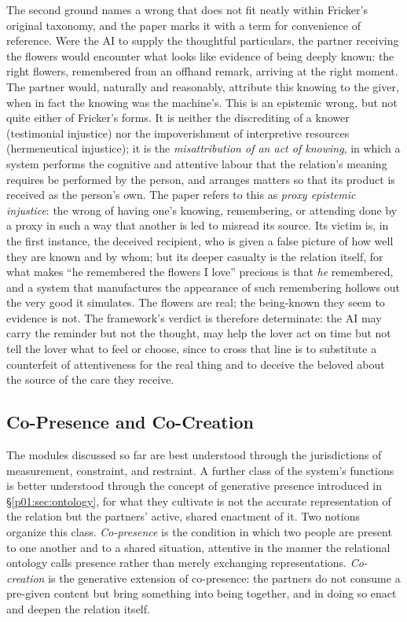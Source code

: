 The second ground names a wrong that does not fit neatly within Fricker's original taxonomy, and the paper marks it with a term for convenience of reference. Were the AI to supply the thoughtful particulars, the partner receiving the flowers would encounter what looks like evidence of being deeply known: the right flowers, remembered from an offhand remark, arriving at the right moment. The partner would, naturally and reasonably, attribute this knowing to the giver, when in fact the knowing was the machine's. This is an epistemic wrong, but not quite either of Fricker's forms. It is neither the discrediting of a knower (testimonial injustice) nor the impoverishment of interpretive resources (hermeneutical injustice); it is the \emph{misattribution of an act of knowing}, in which a system performs the cognitive and attentive labour that the relation's meaning requires be performed by the person, and arranges matters so that its product is received as the person's own. The paper refers to this as \emph{proxy epistemic injustice}: the wrong of having one's knowing, remembering, or attending done by a proxy in such a way that another is led to misread its source. Its victim is, in the first instance, the deceived recipient, who is given a false picture of how well they are known and by whom; but its deeper casualty is the relation itself, for what makes ``he remembered the flowers I love'' precious is that \emph{he} remembered, and a system that manufactures the appearance of such remembering hollows out the very good it simulates. The flowers are real; the being-known they seem to evidence is not. The framework's verdict is therefore determinate: the AI may carry the reminder but not the thought, may help the lover act on time but not tell the lover what to feel or choose, since to cross that line is to substitute a counterfeit of attentiveness for the real thing and to deceive the beloved about the source of the care they receive.

\subsection{Co-Presence and Co-Creation}\label{p01:sec:cocreation}

The modules discussed so far are best understood through the jurisdictions of measurement, constraint, and restraint. A further class of the system's functions is better understood through the concept of generative presence introduced in §\ref{p01:sec:ontology}, for what they cultivate is not the accurate representation of the relation but the partners' active, shared enactment of it. Two notions organize this class. \emph{Co-presence} is the condition in which two people are present to one another and to a shared situation, attentive in the manner the relational ontology calls presence rather than merely exchanging representations. \emph{Co-creation} is the generative extension of co-presence: the partners do not consume a pre-given content but bring something into being together, and in doing so enact and deepen the relation itself.


